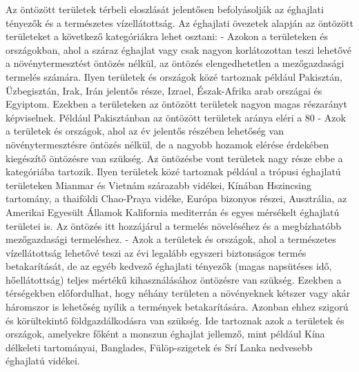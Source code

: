 \documentclass[a4paper,oneside,onecolumn,12pt]{LegrandOrangeBook}
\begin{document}
	Az öntözött területek térbeli eloszlását jelentősen befolyásolják az éghajlati tényezők és a természetes vízellátottság. Az éghajlati övezetek alapján az öntözött területeket a következő kategóriákra lehet osztani:
-	Azokon a területeken és országokban, ahol a száraz éghajlat vagy csak nagyon korlátozottan teszi lehetővé a növénytermesztést öntözés nélkül, az öntözés elengedhetetlen a mezőgazdasági termelés számára. Ilyen területek és országok közé tartoznak például Pakisztán, Üzbegisztán, Irak, Irán jelentős része, Izrael, Észak-Afrika arab országai és Egyiptom. Ezekben a területeken az öntözött területek nagyon magas részarányt képviselnek. Például Pakisztánban az öntözött területek aránya eléri a 80%
-	Azok a területek és országok, ahol az év jelentős részében lehetőség van növénytermesztésre öntözés nélkül, de a nagyobb hozamok elérése érdekében kiegészítő öntözésre van szükség. Az öntözésbe vont területek nagy része ebbe a kategóriába tartozik. Ilyen területek közé tartoznak például a trópusi éghajlatú területeken Mianmar és Vietnám szárazabb vidékei, Kínában Hszincsing tartomány, a thaiföldi Chao-Praya vidéke, Európa bizonyos részei, Ausztrália, az Amerikai Egyesült Államok Kalifornia mediterrán és egyes mérsékelt éghajlatú területei is. Az öntözés itt hozzájárul a termelés növeléséhez és a megbízhatóbb mezőgazdasági termeléshez.
-	Azok a területek és országok, ahol a természetes vízellátottság lehetővé teszi az évi legalább egyszeri biztonságos termés betakarítását, de az egyéb kedvező éghajlati tényezők (magas napsütéses idő, hőellátottság) teljes mértékű kihasználásához öntözésre van szükség. Ezekben a térségekben előfordulhat, hogy néhány területen a növényeknek kétszer vagy akár háromszor is lehetőség nyílik a termények betakarítására. Azonban ehhez szigorú és körültekintő földgazdálkodásra van szükség. Ide tartoznak azok a területek és országok, amelyekre főként a monszun éghajlat jellemző, mint például Kína délkeleti tartományai, Banglades, Fülöp-szigetek és Srí Lanka nedvesebb éghajlatú vidékei.
\end{document}
